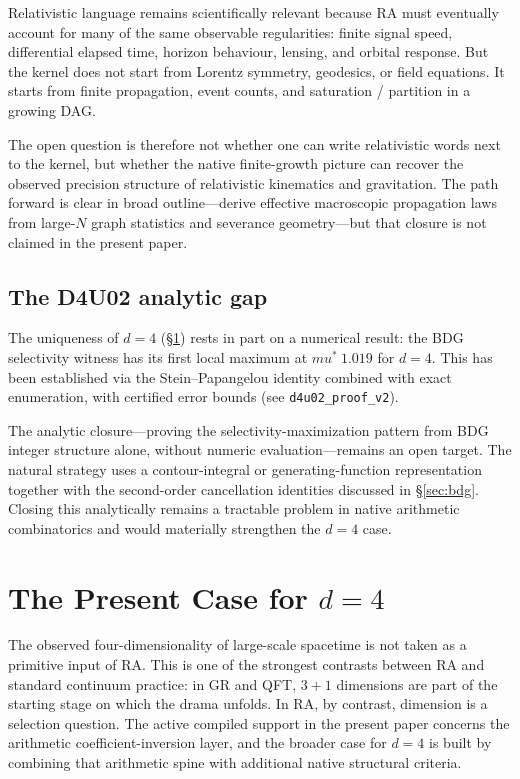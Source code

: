 \documentclass[11pt]{article}
\def\mu{mu}%
\def\approx{~}%
\begin{document}
Relativistic language remains scientifically relevant because RA must eventually account for many of the same observable regularities: finite signal speed, differential elapsed time, horizon behaviour, lensing, and orbital response. But the kernel does not start from Lorentz symmetry, geodesics, or field equations. It starts from finite propagation, event counts, and saturation / partition in a growing DAG.

The open question is therefore not whether one can write relativistic words next to the kernel, but whether the native finite-growth picture can recover the observed precision structure of relativistic kinematics and gravitation. The path forward is clear in broad outline---derive effective macroscopic propagation laws from large-$N$ graph statistics and severance geometry---but that closure is not claimed in the present paper.

\subsection{The D4U02 analytic gap}
\label{sec:d4u02_gap}

The uniqueness of $d=4$ (\S\ref{sec:d4}) rests in part on a numerical result: the BDG selectivity witness has its first local maximum at $\mu^*\approx 1.019$ for $d=4$. This has been established via the Stein--Papangelou identity combined with exact enumeration, with certified error bounds (see \texttt{d4u02\_proof\_v2}).

The analytic closure---proving the selectivity-maximization pattern from BDG integer structure alone, without numeric evaluation---remains an open target. The natural strategy uses a contour-integral or generating-function representation together with the second-order cancellation identities discussed in \S\ref{sec:bdg}. Closing this analytically remains a tractable problem in native arithmetic combinatorics and would materially strengthen the $d=4$ case.

\section{The Present Case for $d=4$}
\label{sec:d4}

The observed four-dimensionality of large-scale spacetime is not taken as a primitive input of RA. This is one of the strongest contrasts between RA and standard continuum practice: in GR and QFT, $3+1$ dimensions are part of the starting stage on which the drama unfolds. In RA, by contrast, dimension is a selection question. The active compiled support in the present paper concerns the arithmetic coefficient-inversion layer, and the broader case for $d=4$ is built by combining that arithmetic spine with additional native structural criteria.
\end{document}
